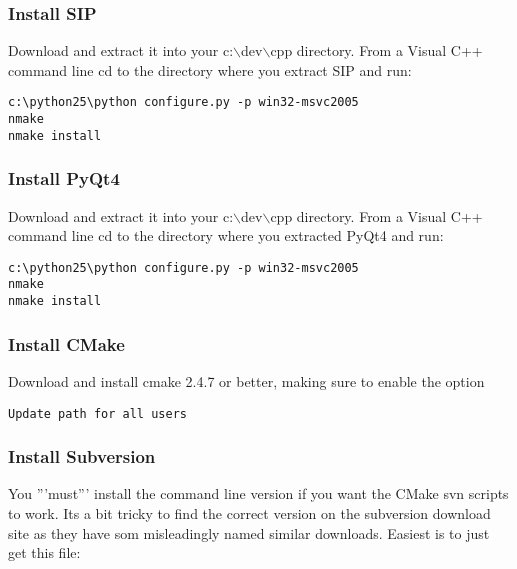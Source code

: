 \subsubsection{Install SIP}
Download  and extract it 
into your c:$\backslash$dev$\backslash$cpp directory.
From a Visual C++ command line cd to the directory where you extract SIP and run:

\begin{verbatim}
c:\python25\python configure.py -p win32-msvc2005
nmake
nmake install
\end{verbatim}

\subsubsection{Install PyQt4}
Download  and extract it 
into your c:$\backslash$dev$\backslash$cpp directory.
From a Visual C++ command line cd to the directory where you extracted PyQt4 and run:

\begin{verbatim}
c:\python25\python configure.py -p win32-msvc2005
nmake
nmake install
\end{verbatim}

\subsubsection{Install CMake}
Download and install cmake 2.4.7 or better, making sure to enable the 
option

\begin{verbatim}
Update path for all users
\end{verbatim}

\subsubsection{Install Subversion}
You '''must''' install the command line version if you want the CMake svn scripts to work.
Its a bit tricky to find the correct version on the subversion download site as they have 
som misleadingly named similar downloads. Easiest is to just get this file:


